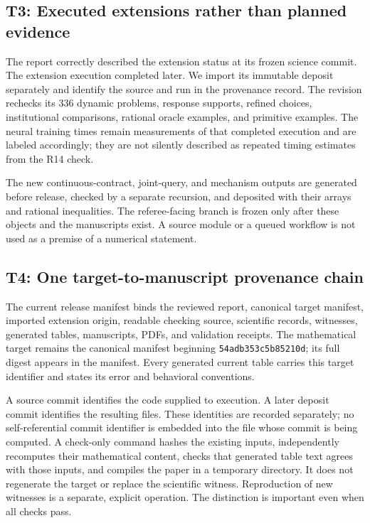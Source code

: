 \subsection{T3: Executed extensions rather than planned evidence}
The report correctly described the extension status at its frozen science commit. The extension execution completed later. We import its immutable deposit separately and identify the source and run in the provenance record. The revision rechecks its 336 dynamic problems, response supports, refined choices, institutional comparisons, rational oracle examples, and primitive examples. The neural training times remain measurements of that completed execution and are labeled accordingly; they are not silently described as repeated timing estimates from the R14 check.

The new continuous-contract, joint-query, and mechanism outputs are generated before release, checked by a separate recursion, and deposited with their arrays and rational inequalities. The referee-facing branch is frozen only after these objects and the manuscripts exist. A source module or a queued workflow is not used as a premise of a numerical statement.

\subsection{T4: One target-to-manuscript provenance chain}
The current release manifest binds the reviewed report, canonical target manifest, imported extension origin, readable checking source, scientific records, witnesses, generated tables, manuscripts, PDFs, and validation receipts. The mathematical target remains the canonical manifest beginning \texttt{54adb353c5b85210d}; its full digest appears in the manifest. Every generated current table carries this target identifier and states its error and behavioral conventions.

A source commit identifies the code supplied to execution. A later deposit commit identifies the resulting files. These identities are recorded separately; no self-referential commit identifier is embedded into the file whose commit is being computed. A check-only command hashes the existing inputs, independently recomputes their mathematical content, checks that generated table text agrees with those inputs, and compiles the paper in a temporary directory. It does not regenerate the target or replace the scientific witness. Reproduction of new witnesses is a separate, explicit operation. The distinction is important even when all checks pass.

